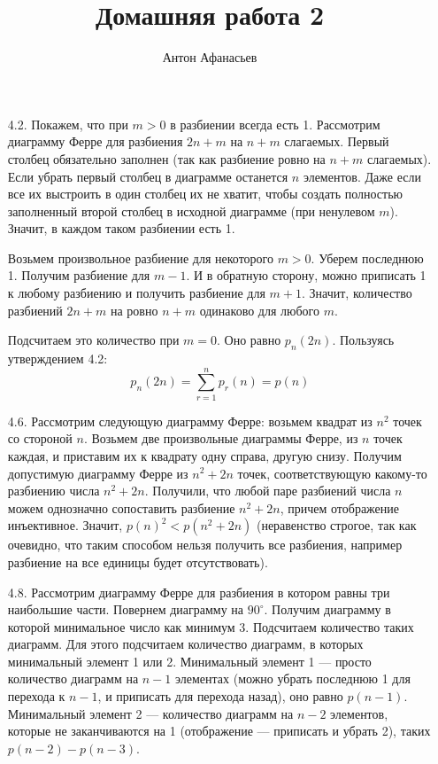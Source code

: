 \documentclass[10pt]{article}
\begin{document}
\title{Домашняя работа 2}
\author{Антон Афанасьев}
\maketitle

\begin{enumerate}
	\item[4.2.] Покажем, что при $m > 0$ в разбиении всегда есть 1. Рассмотрим диаграмму Ферре для разбиения $2n+m$ на $n+m$ слагаемых. Первый столбец обязательно заполнен (так как разбиение ровно на $n+m$ слагаемых). Если убрать первый столбец в диаграмме останется $n$ элементов. Даже если все их выстроить в один столбец их не хватит, чтобы создать полностью заполненный второй столбец в исходной диаграмме (при ненулевом $m$). Значит, в каждом таком разбиении есть 1. 
	
	Возьмем произвольное разбиение для некоторого $m>0$. Уберем последнюю 1. Получим разбиение для $m-1$. И в обратную сторону, можно приписать 1 к любому разбиению и получить разбиение для $m+1$. Значит, количество разбиений $2n+m$ на ровно $n+m$ одинаково для любого $m$.
	
	Подсчитаем это количество при $m=0$. Оно равно $p_n(2n)$. Пользуясь утверждением 4.2:
	$$p_n(2n) = \sum_{r=1}^n p_r(n) = p(n)$$
	
	\item[4.6.] Рассмотрим следующую диаграмму Ферре: возьмем квадрат из $n^2$ точек со стороной $n$. Возьмем две произвольные диаграммы Ферре, из $n$ точек каждая, и приставим их к квадрату одну справа, другую снизу. Получим допустимую диаграмму Ферре из $n^2 + 2n$ точек, соответствующую какому-то разбиению числа $n^2 + 2n$. Получили, что любой паре разбиений числа $n$ можем однозначно сопоставить разбиение $n^2 + 2n$, причем отображение инъективное. Значит, $p(n)^2 < p(n^2 + 2n)$ (неравенство строгое, так как очевидно, что таким способом нельзя получить все разбиения, например разбиение на все единицы будет отсутствовать).
	
	\item[4.8.] Рассмотрим диаграмму Ферре для разбиения в котором равны три наибольшие части. Повернем диаграмму на $90^\circ$. Получим диаграмму в которой минимальное число как минимум 3. Подсчитаем количество таких диаграмм. Для этого подсчитаем количество диаграмм, в которых минимальный элемент 1 или 2. Минимальный элемент 1 --- просто количество диаграмм на $n-1$ элементах (можно убрать последнюю 1 для перехода к $n-1$, и приписать для перехода назад), оно равно $p(n-1)$. Минимальный элемент 2 --- количество диаграмм на $n-2$ элементов, которые не заканчиваются на 1 (отображение --- приписать и убрать 2), таких $p(n-2) - p(n-3)$.
	

\end{enumerate}
\end{document}
